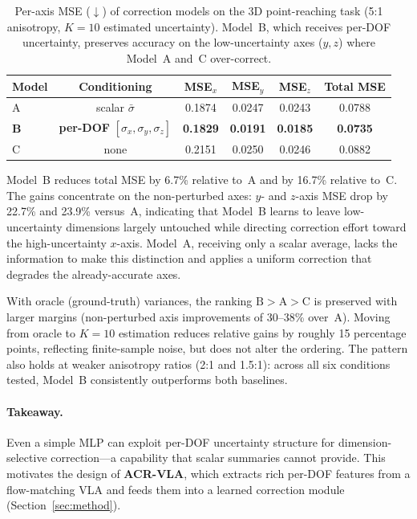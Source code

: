 \begin{table}[t]
\centering
\caption{Per-axis MSE ($\downarrow$) of correction models on the 3D point-reaching task (5:1 anisotropy, $K{=}10$ estimated uncertainty). Model~B, which receives per-DOF uncertainty, preserves accuracy on the low-uncertainty axes ($y,z$) where Model~A and~C over-correct.}
\label{tab:motivating}
\small
\begin{tabular}{lccccc}
\toprule
Model & Conditioning & MSE$_x$ & MSE$_y$ & MSE$_z$ & Total MSE \\
\midrule
A & scalar $\bar\sigma$ & 0.1874 & 0.0247 & 0.0243 & 0.0788 \\
\textbf{B} & \textbf{per-DOF} $[\sigma_x,\sigma_y,\sigma_z]$ & \textbf{0.1829} & \textbf{0.0191} & \textbf{0.0185} & \textbf{0.0735} \\
C & none & 0.2151 & 0.0250 & 0.0246 & 0.0882 \\
\bottomrule
\end{tabular}
\end{table}

Model~B reduces total MSE by 6.7\% relative to~A and by 16.7\% relative to~C.  The gains concentrate on the non-perturbed axes: $y$- and $z$-axis MSE drop by 22.7\% and 23.9\% versus~A, indicating that Model~B learns to leave low-uncertainty dimensions largely untouched while directing correction effort toward the high-uncertainty $x$-axis.  Model~A, receiving only a scalar average, lacks the information to make this distinction and applies a uniform correction that degrades the already-accurate axes.

With oracle (ground-truth) variances, the ranking $\text{B}>\text{A}>\text{C}$ is preserved with larger margins (non-perturbed axis improvements of 30--38\% over~A).  Moving from oracle to $K{=}10$ estimation reduces relative gains by roughly 15 percentage points, reflecting finite-sample noise, but does not alter the ordering.  The pattern also holds at weaker anisotropy ratios (2:1 and 1.5:1): across all six conditions tested, Model~B consistently outperforms both baselines.

\paragraph{Takeaway.}
Even a simple MLP can exploit per-DOF uncertainty structure for dimension-selective correction---a capability that scalar summaries cannot provide.  This motivates the design of \textbf{ACR-VLA}, which extracts rich per-DOF features from a flow-matching VLA and feeds them into a learned correction module (Section~\ref{sec:method}).


